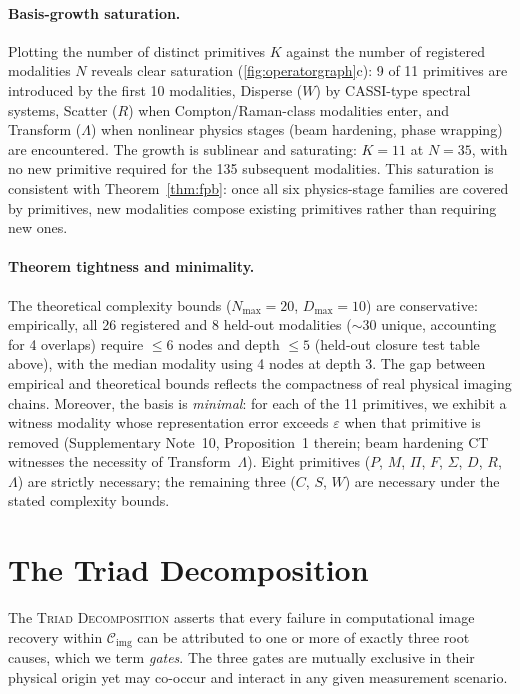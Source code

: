 \documentclass[11pt]{article}
\newcommand{\ctier}{\mathcal{C}_{\mathrm{img}}}
\newcommand{\triad}{\textsc{Triad Decomposition}}
\begin{document}
\paragraph{Basis-growth saturation.}
Plotting the number of distinct primitives $K$ against the number of registered modalities $N$ reveals clear saturation (\cref{fig:operatorgraph}c): 9 of 11 primitives are introduced by the first 10 modalities, Disperse ($W$) by CASSI-type spectral systems, Scatter ($R$) when Compton/Raman-class modalities enter, and Transform ($\Lambda$) when nonlinear physics stages (beam hardening, phase wrapping) are encountered. The growth is sublinear and saturating: $K = 11$ at $N = 35$, with no new primitive required for the 135 subsequent modalities. This saturation is consistent with Theorem~\ref{thm:fpb}: once all six physics-stage families are covered by primitives, new modalities compose existing primitives rather than requiring new ones.

\paragraph{Theorem tightness and minimality.}
The theoretical complexity bounds ($N_{\max} = 20$, $D_{\max} = 10$) are conservative: empirically, all 26 registered and 8 held-out modalities (${\sim}30$ unique, accounting for 4 overlaps) require $\leq 6$ nodes and depth $\leq 5$ (held-out closure test table above), with the median modality using 4 nodes at depth 3. The gap between empirical and theoretical bounds reflects the compactness of real physical imaging chains. Moreover, the basis is \emph{minimal}: for each of the 11 primitives, we exhibit a witness modality whose representation error exceeds $\varepsilon$ when that primitive is removed (Supplementary Note~10, Proposition~1 therein; beam hardening CT witnesses the necessity of Transform~$\Lambda$). Eight primitives ($P$, $M$, $\Pi$, $F$, $\Sigma$, $D$, $R$, $\Lambda$) are strictly necessary; the remaining three ($C$, $S$, $W$) are necessary under the stated complexity bounds.



\section*{The Triad Decomposition}

The \triad{} asserts that every failure in computational image recovery within $\ctier$ can be attributed to one or more of exactly three root causes, which we term \emph{gates}. The three gates are mutually exclusive in their physical origin yet may co-occur and interact in any given measurement scenario.
\end{document}
